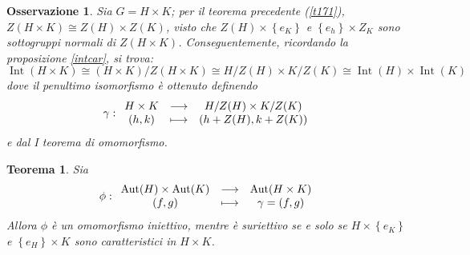 \documentclass[12pt]{scrartcl}
\theoremstyle{style}
\newtheorem{teorema}{Teorema}[section]
\newtheorem{osservazione}{Osservazione}[section]
\numberwithin{equation}{subsection}
\begin{document}
\begin{osservazione}
	Sia $G = H \times K$; per il teorema precedente (\ref{t171}), $Z(H \times  K) \cong Z(H) \times Z(K)$, visto che $Z(H) \times \left\{ e_K \right\} $ e $\left\{ e_h \right\} \times Z_K$ sono sottogruppi normali di $Z(H\times K)$.
	Conseguentemente, ricordando la proposizione \ref{intcar}, si trova:
	\[
	\operatorname{Int} (H \times K) \cong (H\times K )/ Z(H\times K)\cong H / Z(H) \times K / Z(K)\cong \operatorname{Int} (H) \times \operatorname{Int} (K)
	\] 
	dove il penultimo isomorfismo \`e ottenuto definendo
	\[
	\gamma :
	\begin{array}
		{c c c}
		H \times K & \longrightarrow &H / Z(H) \times K / Z(K)\\
		(h,k) & \longmapsto & \left(h + Z(H) , k + Z(K)\right) 
	\end{array}
	\] 
	e dal I teorema di omomorfismo.
\end{osservazione}
\begin{teorema}
	Sia
	\[
	\phi : 
	\begin{array}
		{c c c}
		\operatorname{Aut} (H) \times \operatorname{Aut} (K) & \longrightarrow & \operatorname{Aut} (H \times K)\\
		(f,g) & \longmapsto & \gamma = (f,g)
	\end{array}
	\] 
	Allora $\phi $ \`e un omomorfismo iniettivo, mentre \`e suriettivo se e solo se $H \times \left\{ e_K \right\} $ e $\left\{ e_H \right\} \times K$ sono caratteristici in $H\times K$.
\end{teorema}
\end{document}
